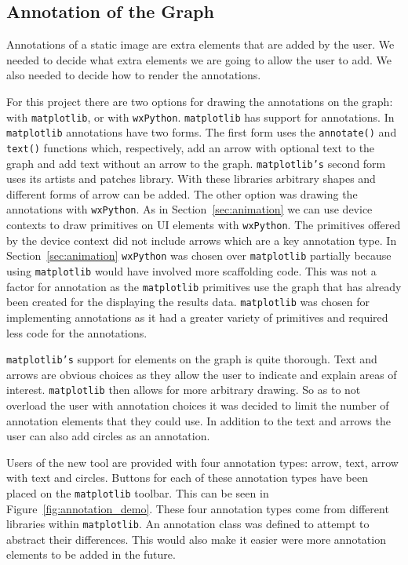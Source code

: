 \subsection{Annotation of the Graph}
\label{sec:annotation_graph}

Annotations of a static image are extra elements that are added by the user.  We needed to decide what extra elements we are going to allow the user to add.  We also needed to decide how to render the annotations.

For this project there are two options for drawing the annotations on the graph: with \texttt{matplotlib}, or with \texttt{wxPython}.  \texttt{matplotlib} has support for annotations.  In \texttt{matplotlib} annotations have two forms. The first form uses the \texttt{annotate()} and \texttt{text()} functions which, respectively, add an arrow with optional text to the graph and add text without an arrow to the graph.  \texttt{matplotlib's} second form uses its artists and patches library.  With these libraries arbitrary shapes and different forms of arrow can be added.  The other option was drawing the annotations with \texttt{wxPython}.  As in Section~\ref{sec:animation} we can use device contexts to draw primitives on \ac{UI} elements with \texttt{wxPython}.  The primitives offered by the device context did not include arrows which are a key annotation type.  In Section~\ref{sec:animation} \texttt{wxPython} was chosen over \texttt{matplotlib} partially because using \texttt{matplotlib} would have involved more scaffolding code.  This was not a factor for annotation as the \texttt{matplotlib} primitives use the graph that has already been created for the displaying the results data.  \texttt{matplotlib} was chosen for implementing annotations as it had a greater variety of primitives and required less code for the annotations.

\texttt{matplotlib's} support for elements on the graph is quite thorough.  Text and arrows are obvious choices as they allow the user to indicate and explain areas of interest.  \texttt{matplotlib} then allows for more arbitrary drawing.  So as to not overload the user with annotation choices it was decided to limit the number of annotation elements that they could use.  In addition to the text and arrows the user can also add circles as an annotation.

Users of the new tool are provided with four annotation types: arrow, text, arrow with text and circles.  Buttons for each of these annotation types have been placed on the \texttt{matplotlib} toolbar.  This can be seen in Figure~\ref{fig:annotation_demo}.  These four annotation types come from different libraries within \texttt{matplotlib}.  An annotation class was defined to attempt to abstract their differences.  This would also make it easier were more annotation elements to be added in the future.

